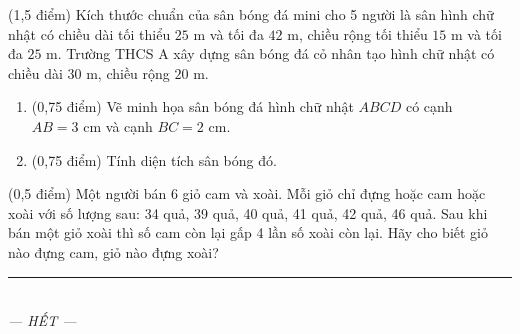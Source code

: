 \documentclass[12pt,a4paper]{article}
\begin{document}
\begin{ex} (1,5 điểm)
Kích thước chuẩn của sân bóng đá mini cho 5 người là sân hình chữ nhật có chiều dài tối thiểu $25\text{ m}$ và tối đa $42\text{ m}$, chiều rộng tối thiểu $15\text{ m}$ và tối đa $25\text{ m}$. Trường THCS A xây dựng sân bóng đá cỏ nhân tạo hình chữ nhật có chiều dài $30\text{ m}$, chiều rộng $20\text{ m}$.
\begin{enumerate}[label=\textbf{\alph*)}, leftmargin=0.8cm, itemsep=2pt]
\item (0,75 điểm) Vẽ minh họa sân bóng đá hình chữ nhật $ABCD$ có cạnh $AB = 3\text{ cm}$ và cạnh $BC = 2\text{ cm}$.
\item (0,75 điểm) Tính diện tích sân bóng đó.
\end{enumerate}
\end{ex}
\vspace{1.5mm}

\begin{ex} (0,5 điểm)
Một người bán 6 giỏ cam và xoài. Mỗi giỏ chỉ đựng hoặc cam hoặc xoài với số lượng sau: 34 quả, 39 quả, 40 quả, 41 quả, 42 quả, 46 quả. Sau khi bán một giỏ xoài thì số cam còn lại gấp 4 lần số xoài còn lại. Hãy cho biết giỏ nào đựng cam, giỏ nào đựng xoài?
\end{ex}
\vspace{1.5mm}


\begin{center}
\rule{4cm}{0.4pt}\\
\textit{--- HẾT ---}
\end{center}
\end{document}
